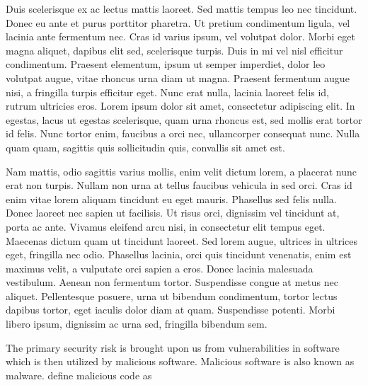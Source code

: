 Duis scelerisque ex ac lectus mattis laoreet. Sed mattis tempus leo nec tincidunt. Donec eu ante et purus porttitor pharetra. Ut pretium condimentum ligula, vel lacinia ante fermentum nec. Cras id varius ipsum, vel volutpat dolor. Morbi eget magna aliquet, dapibus elit sed, scelerisque turpis. Duis in mi vel nisl efficitur condimentum. Praesent elementum, ipsum ut semper imperdiet, dolor leo volutpat augue, vitae rhoncus urna diam ut magna. Praesent fermentum augue nisi, a fringilla turpis efficitur eget. Nunc erat nulla, lacinia laoreet felis id, rutrum ultricies eros. Lorem ipsum dolor sit amet, consectetur adipiscing elit. In egestas, lacus ut egestas scelerisque, quam urna rhoncus est, sed mollis erat tortor id felis. Nunc tortor enim, faucibus a orci nec, ullamcorper consequat nunc. Nulla quam quam, sagittis quis sollicitudin quis, convallis sit amet est.

Nam mattis, odio sagittis varius mollis, enim velit dictum lorem, a placerat nunc erat non turpis. Nullam non urna at tellus faucibus vehicula in sed orci. Cras id enim vitae lorem aliquam tincidunt eu eget mauris. Phasellus sed felis nulla. Donec laoreet nec sapien ut facilisis. Ut risus orci, dignissim vel tincidunt at, porta ac ante. Vivamus eleifend arcu nisi, in consectetur elit tempus eget. Maecenas dictum quam ut tincidunt laoreet. Sed lorem augue, ultrices in ultrices eget, fringilla nec odio. Phasellus lacinia, orci quis tincidunt venenatis, enim est maximus velit, a vulputate orci sapien a eros. Donec lacinia malesuada vestibulum. Aenean non fermentum tortor. Suspendisse congue at metus nec aliquet. Pellentesque posuere, urna ut bibendum condimentum, tortor lectus dapibus tortor, eget iaculis dolor diam at quam. Suspendisse potenti. Morbi libero ipsum, dignissim ac urna sed, fringilla bibendum sem.


The primary security risk is brought upon us from vulnerabilities in software which is then utilized by malicious software.
Malicious software is also known as \gls{malware}.
\citeauthor{mcgraw2000attacking} \cite{mcgraw2000attacking} define malicious code as \emph{}

